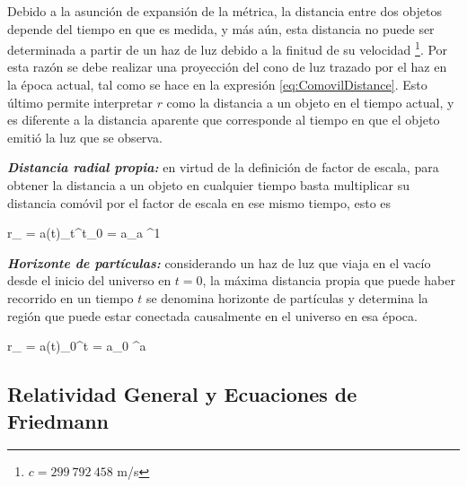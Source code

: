 Debido a la asunción de expansión de la métrica, la distancia entre dos 
objetos depende del tiempo en que es medida, y más aún, esta distancia no 
puede ser determinada a partir de un haz de luz debido a la finitud de su
velocidad \footnote{$c=299\ 792\ 458$ m/s}. Por esta razón se debe 
realizar una proyección del cono de luz trazado por el haz en la época 
actual, tal como se hace en la expresión \ref{eq:ComovilDistance}. Esto 
último permite interpretar $r$ como la distancia a un objeto en el tiempo
actual, y es diferente a la distancia aparente que corresponde al 
tiempo en que el objeto emitió la luz que se observa.


\textit{\textbf{Distancia radial propia:}} en virtud de la definición de
factor de escala, para obtener la distancia a un objeto en cualquier 
tiempo basta multiplicar su distancia comóvil por el factor de escala en 
ese mismo tiempo, esto es


{ r_{} = a(t)\int_t^{t_0}  = 
a\int_a ^1  }


\textit{\textbf{Horizonte de partículas:}} considerando un haz de luz que
viaja en el vacío desde el inicio del universo en $t=0$, la máxima 
distancia propia que puede haber recorrido en un tiempo $t$ se denomina 
horizonte de partículas y determina la región que puede estar conectada 
causalmente en el universo en esa época.


{ r_{} = a(t)\int_0^{t}  = 
a\int_0 ^a  }


	\subsection{Relatividad General y Ecuaciones de Friedmann}
	\label{subsec:GeneralRelativityAndFriedmannEquations}
	

